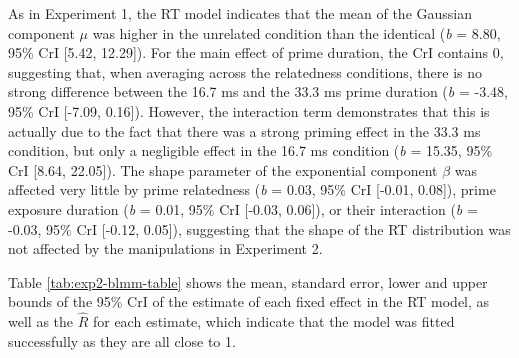 \documentclass[
  english,
  man,floatsintext]{apa6}
\begin{document}
As in Experiment 1, the RT model indicates that the mean of the Gaussian component \(\mu\) was higher in the unrelated condition than the identical (\emph{b} = 8.80, 95\% CrI {[}5.42, 12.29{]}). For the main effect of prime duration, the CrI contains 0, suggesting that, when averaging across the relatedness conditions, there is no strong difference between the 16.7 ms and the 33.3 ms prime duration (\emph{b} = -3.48, 95\% CrI {[}-7.09, 0.16{]}). However, the interaction term demonstrates that this is actually due to the fact that there was a strong priming effect in the 33.3 ms condition, but only a negligible effect in the 16.7 ms condition (\emph{b} = 15.35, 95\% CrI {[}8.64, 22.05{]}). The shape parameter of the exponential component \(\beta\) was affected very little by prime relatedness (\emph{b} = 0.03, 95\% CrI {[}-0.01, 0.08{]}), prime exposure duration (\emph{b} = 0.01, 95\% CrI {[}-0.03, 0.06{]}), or their interaction (\emph{b} = -0.03, 95\% CrI {[}-0.12, 0.05{]}), suggesting that the shape of the RT distribution was not affected by the manipulations in Experiment 2.

Table \ref{tab:exp2-blmm-table} shows the mean, standard error, lower and upper bounds of the 95\% CrI of the estimate of each fixed effect in the RT model, as well as the \(\hat{R}\) for each estimate, which indicate that the model was fitted successfully as they are all close to 1.

\newpage
\end{document}
